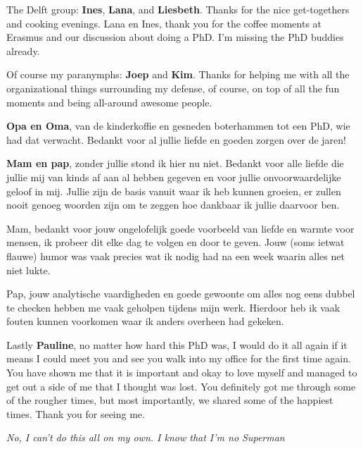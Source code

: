 The Delft group: \textbf{Ines}, \textbf{Lana}, and \textbf{Liesbeth}.
Thanks for the nice get-togethers and cooking evenings.
Lana en Ines, thank you for the coffee moments at Erasmus and our discussion about doing a PhD. I'm missing the PhD buddies already.

Of course my paranymphs: \textbf{Joep} and \textbf{Kim}.
Thanks for helping me with all the organizational things surrounding my defense, of course, on top of all the fun moments and being all-around awesome people.

\textbf{Opa en Oma}, van de kinderkoffie en gesneden boterhammen tot een PhD, wie had dat verwacht.
Bedankt voor al jullie liefde en goeden zorgen over de jaren!

\textbf{Mam en pap}, zonder jullie stond ik hier nu niet.
Bedankt voor alle liefde die jullie mij van kinds af aan al hebben gegeven en voor jullie onvoorwaardelijke geloof in mij.
Jullie zijn de basis vanuit waar ik heb kunnen groeien, er zullen nooit genoeg woorden zijn om te zeggen hoe dankbaar ik jullie daarvoor ben.

Mam, bedankt voor jouw ongelofelijk goede voorbeeld van liefde en warmte voor mensen, ik probeer dit elke dag te volgen en door te geven.
Jouw (soms ietwat flauwe) humor was vaak precies wat ik nodig had na een week waarin alles net niet lukte.

Pap, jouw analytische vaardigheden en goede gewoonte om alles nog eens dubbel te checken hebben me vaak geholpen tijdens mijn werk.
Hierdoor heb ik vaak fouten kunnen voorkomen waar ik anders overheen had gekeken.

Lastly \textbf{Pauline}, no matter how hard this PhD was, I would do it all again if it means I could meet you and see you walk into my office for the first time again.
You have shown me that it is important and okay to love myself and managed to get out a side of me that I thought was lost.
You definitely got me through some of the rougher times, but most importantly, we shared some of the happiest times.
Thank you for seeing me.

\vspace*{10em}


\hfill \textit{No, I can't do this all on my own. I know that I'm no Superman} \hfill
